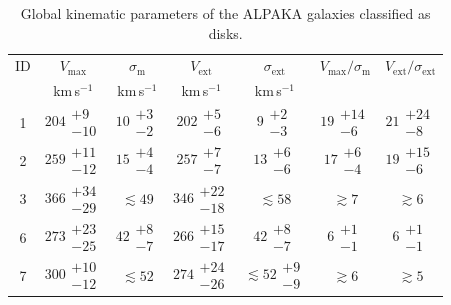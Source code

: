 \begin{table}[htbp!]
\begin{center}
\caption{Global kinematic parameters of the ALPAKA galaxies classified as disks. 
}
\label{tab:vsigma}
\begin{tabular}{ccccccc}
\\
\hline\hline \noalign{\smallskip}
ID   & $V_{\mathrm{max}}$ & $\sigma_{\mathrm{m}}$ & $V_{\mathrm{ext}}$ & $\sigma_{\mathrm{ext}}$ & $V_{\mathrm{max}}/\sigma_{\mathrm{m}}$ & $V_{\mathrm{ext}}/\sigma_{\mathrm{ext}}$\\
 & km\,s$^{-1}$ &  km\,s$^{-1}$ & km\,s$^{-1}$ & km\,s$^{-1}$\\
\noalign{\smallskip}
\hline
\noalign{\medskip}
1 & $ 204 \substack{+ 9 \\ -10 }$ &$ 10 \substack{+ 3 \\- 2 }$ &$ 202 \substack{+ 5 \\- 6 }$ &$ 9 \substack{+ 2 \\- 3 }$ &$ 19 \substack{+ 14 \\- 6 }$ &$ 21 \substack{+ 24 \\- 8 }$ \\
2 & $ 259 \substack{+ 11 \\ -12 }$ &$ 15 \substack{+ 4 \\- 4 }$ &$ 257 \substack{+ 7 \\- 7 }$ &$ 13 \substack{+ 6 \\- 6 }$ &$ 17 \substack{+ 6 \\- 4 }$ &$ 19 \substack{+ 15 \\- 6 }$ \\
3 & $ 366 \substack{+ 34 \\ -29 }$ &$ \lesssim 49 $ &$ 346 \substack{+ 22 \\- 18 }$ &$ \lesssim58 $ & $\gtrsim 7 $ & $\gtrsim 6 $ \\
6 & $ 273 \substack{+ 23 \\ -25 }$ &$ 42 \substack{+ 8 \\- 7 }$ &$ 266 \substack{+ 15 \\- 17 }$ &$ 42 \substack{+ 8 \\- 7 }$ &$ 6 \substack{+ 1 \\- 1 }$ &$ 6 \substack{+ 1 \\- 1 }$ \\
7 & $ 300 \substack{+ 10 \\ -12 }$ &$ \lesssim 52$ &$ 274 \substack{+ 24 \\- 26 }$ &$ \lesssim 52 \substack{+ 9 \\- 9 }$ &$ \gtrsim 6 $ &$ \gtrsim 5 $ \\

\end{tabular}
\end{center}
\end{table}
